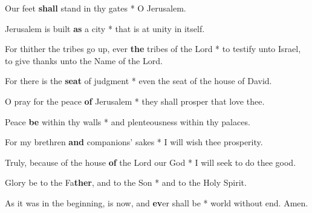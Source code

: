 \begin{multicols}{2}
	Our feet \textbf{shall} stand in thy gates * O Jerusalem.
	
	Jerusalem is built \textbf{as} a city * that is at unity in itself.
	
	For thither the tribes go up, ever \textbf{the} tribes of the Lord * to testify unto Israel, to give thanks unto the Name of the Lord.
	
	For there is the \textbf{seat} of judgment * even the seat of the house of David.
	
	O pray for the peace \textbf{of} Jerusalem * they shall prosper that love thee.
	
	Peace \textbf{be} within thy walls * and plenteousness within thy palaces.
	
	For my brethren \textbf{and} companions' sakes * I will wish thee prosperity.
	
	Truly, because of the house \textbf{of} the Lord our God * I will seek to do thee good.
	
	Glory be to the Fa\textbf{ther}, and to the Son * and to the Holy Spirit.
	
	As it was in the beginning, is now, and \textbf{ev}er shall be * world without end. Amen.
\end{multicols}